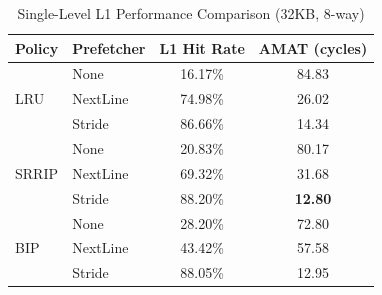 
\scriptsize

\begin{table}[H]
\centering
\caption{\small Single-Level L1 Performance Comparison (32KB, 8-way)}
\label{tab:l1_comparison}
\small
\begin{tabular}{llcc}
\toprule
\textbf{Policy} & \textbf{Prefetcher} & \textbf{L1 Hit Rate} & \textbf{AMAT (cycles)} \\
\midrule
\multirow{3}{*}{LRU} & None & 16.17\% & 84.83 \\
                     & NextLine & 74.98\% & 26.02 \\
                     & Stride & 86.66\% & 14.34 \\
\midrule
\multirow{3}{*}{SRRIP} & None & 20.83\% & 80.17 \\
                       & NextLine & 69.32\% & 31.68 \\
                       & Stride & 88.20\% & \textbf{12.80} \\
\midrule
\multirow{3}{*}{BIP} & None & 28.20\% & 72.80 \\
                     & NextLine & 43.42\% & 57.58 \\
                     & Stride & 88.05\% & 12.95 \\
\bottomrule
\end{tabular}
\end{table}

